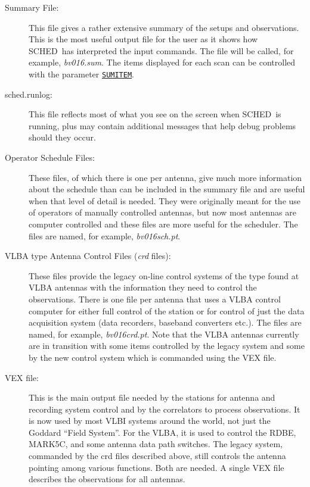 \documentclass{report}
\newcommand{\schedb}{{\sc SCHED~}}
\begin{document}
\begin{description}

\item[Summary File:] This file gives a rather extensive summary of the
setups and observations.  This is the most useful output file for the
user as it shows how \schedb has interpreted the input commands.  The
file will be called, for example, {\sl bv016.sum}.  The items displayed
for each scan can be controlled with the parameter 
{\hyperref[MP:SUMITEM]{{\tt SUMITEM}}}.

\item[sched.runlog:] This file reflects most of what you see on the
screen when \schedb is running, plus may contain additional messages
that help debug problems should they occur.

\item[Operator Schedule Files:] These files, of which there is one per
antenna, give much more information about the schedule than can be
included in the summary file and are useful when that level of detail
is needed.  They were originally meant for the use of operators of
manually controlled antennas, but now most antennas are computer
controlled and these files are more useful for the scheduler.  The
files are named, for example, {\sl bv016sch.pt}.

\item[VLBA type Antenna Control Files ({\sl crd} files):] These files
provide the legacy on-line control systems of the type found at VLBA
antennas with the information they need to control the observations.
There is one file per antenna that uses a VLBA control computer for
either full control of the station or for control of just the data
acquisition system (data recorders, baseband converters etc.).  The
files are named, for example, {\sl bv016crd.pt}.  Note that the
VLBA antennas currently are in transition with some items controlled
by the legacy system and some by the new control system which is
commanded using the VEX file.


\item[VEX file:] This is the main output file needed by the stations
for antenna and recording system control and by the correlators to
process observations.  It is now used by most VLBI systems around the
world, not just the Goddard ``Field System''.  For the VLBA, it is
used to control the RDBE, MARK5C, and some antenna data path switches.
The legacy system, commanded by the crd files described above, still
controls the antenna pointing among various functions.  Both are
needed.  A single VEX file describes the observations for all
antennas.


\end{description}
\end{document}
